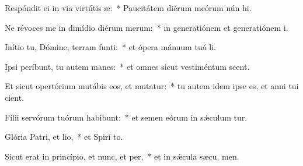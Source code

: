 \item Respóndit ei in via virtútis æ:~* Paucitátem diérum meórum nún hi.
\item Ne révoces me in dimídio diérum merum:~* in generatiónem et generatiónem  i.
\item Inítio tu, Dómine, terram funti:~* et ópera mánuum tuá  li.
\item Ipsi períbunt, tu autem manes:~* et omnes sicut vestiméntum scent.
\item Et sicut opertórium mutábis eos, et mutatur:~* tu autem idem ipse es, et anni tui  cient.
\item Fílii servórum tuórum habibunt:~* et semen eórum in sǽculum tur.
\item Glória Patri, et lio,~* et Spirí to.
\item Sicut erat in princípio, et nunc, et per,~* et in sǽcula sæcu. men.
